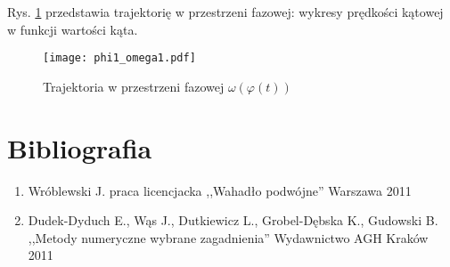 \documentclass[11pt]{aghdpl}
\begin{document}
Rys. \ref{phi_omega} przedstawia trajektorię w przestrzeni fazowej: wykresy prędkości kątowej w funkcji wartości kąta.
\begin{figure}[h!]
	\centering
	\texttt{[image: phi1\_omega1.pdf]}
	\caption{Trajektoria w przestrzeni fazowej $\omega(\varphi(t))$	}
	\label{phi_omega}
\end{figure}

\clearpage
\section{Bibliografia}
\renewcommand*\labelenumi{[\theenumi]}

\begin{enumerate}
\item Wróblewski J. praca licencjacka ,,Wahadło podwójne'' Warszawa 2011 \label{bib_one}
\item Dudek-Dyduch E., Wąs J., Dutkiewicz L., Grobel-Dębska K., Gudowski B. ,,Metody numeryczne wybrane zagadnienia'' Wydawnictwo AGH Kraków 2011 \label{bib_two}

\end{enumerate}
\end{document}
